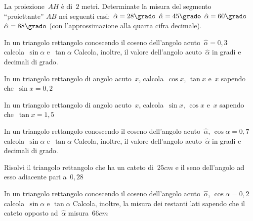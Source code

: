 \begin{multicols}{2}
\begin{esercizio}
\label{ese:G.14}
La proiezione~\(AH\) è di~\(2\) metri. Determinate la misura 
del segmento ``proiettante'' \(AB\) nei seguenti casi:~\({\hat{\alpha}}=28\grado\)
\({\hat{\alpha}}=45\grado\) \({\hat{\alpha}}=60\grado\) \({\hat{\alpha}}=88\grado\) 
(con l'approssimazione alla quarta cifra decimale).
\begin{center}
 
\end{center}
\end{esercizio}

\begin{esercizio}
\label{ese:G.15}
In un triangolo rettangolo conoscendo il coseno dell'angolo 
acuto~\(\hat{\alpha}=0,3\) calcola~\(\sin \alpha\) e~\(\tan \alpha\)
Calcola, inoltre, il valore dell'angolo acuto~\(\hat{\alpha}\) in gradi e decimali 
di grado.
\end{esercizio}

\begin{esercizio}
\label{ese:G.16}
In un triangolo rettangolo di angolo acuto~\(x\), calcola~\(\cos x\), \(\tan x\) 
e~\(x\) sapendo che~\(\sin x=0,2\)
\end{esercizio}

\begin{esercizio}
\label{ese:G.17}
In un triangolo rettangolo di angolo acuto~\(x\), calcola~\(\sin x\), \(\cos x\) 
e~\(x\) sapendo che~\(\tan x =1,5\)
\end{esercizio}

\begin{esercizio}
\label{ese:G.18}
In un triangolo rettangolo conoscendo il coseno dell'angolo 
acuto~\(\hat{\alpha}\), \(\cos \alpha = 0,7\) calcola~\(\sin \alpha\) e~\(\tan \alpha\)
Calcola, inoltre, il valore dell'angolo acuto~\(\hat{\alpha}\) in gradi e decimali 
di grado.
\end{esercizio}


\begin{esercizio}
\label{ese:G.20}
Risolvi il triangolo rettangolo che ha un cateto di~\(25\unit{cm}\) e il seno 
dell'angolo ad esso adiacente pari a~\(0,28\)
\end{esercizio}

\begin{esercizio}
\label{ese:G.21}
In un triangolo rettangolo conoscendo il coseno dell'angolo 
acuto~\(\hat{\alpha}\), \(\cos \alpha = 0,2\) calcola~\(\sin \alpha\) e
\(\tan \alpha\) Calcola, inoltre, la misura dei restanti lati sapendo che il 
cateto opposto ad~\(\hat{\alpha}\) misura~\(66\unit{cm}\)
\end{esercizio}
\end{multicols}

